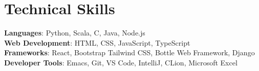 \documentclass[letterpaper,11pt]{article}
\begin{document}
%
\section{Technical Skills}
 \begin{itemize}[leftmargin=0.15in, label={}]
    \small{\item{
     \textbf{Languages}{: Python, Scala, C, Java, Node.js} \\
     \textbf{Web Development}{: HTML, CSS, JavaScript, TypeScript} \\
     \textbf{Frameworks}{: React, Bootstrap Tailwind CSS, Bottle Web Framework, Django} \\
     \textbf{Developer Tools}{: Emacs, Git, VS Code, IntelliJ, CLion, Microsoft Excel} \\
     \textbf{}{}
    }}
 \end{itemize}


\end{document}
